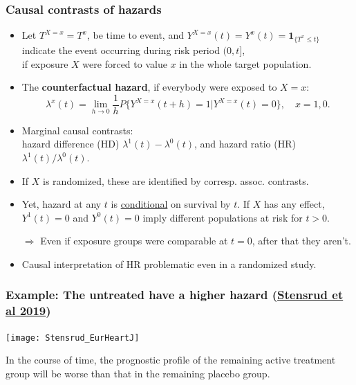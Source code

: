 \documentclass[12pt,dvipsnames,t,aspectratio=169, handout%
]{beamer}
\begin{document}
\begin{frame}
\frametitle{\large Causal contrasts of hazards}

\begin{itemize}
\item
  Let $T^{X=x} = T^x$, be time to event, and 
$Y^{X=x}(t) = Y^x(t) = {\mathbf 1}_{\{T^x \leq t\}}$ 
indicate the event occurring during risk period $(0,t]$, \\ if exposure $X$ were forced
to value $x$ in the {whole target population}.
\pause 
\medskip
\item
The \textbf{counterfactual hazard}, if everybody were exposed to $X=x$:
$$ \lambda^x(t) %
 = \lim_{h \to 0} \frac{1}{h} P\{ Y^{X=x}(t + h)=1 | Y^{X=x}(t) = 0 \}, \quad x = 1,0. $$
\item
Marginal causal contrasts: \\ hazard difference (HD) $\lambda^1(t) - \lambda^0(t)$,
and hazard ratio (HR) ${\lambda^1(t)}/{ \lambda^0(t) }$.
\pause
\medskip
\item
If $X$ is randomized, these are identified by corresp. assoc. contrasts. 
\medskip					
\item  
Yet, hazard at any $t$ is \underline{conditional} on survival by $t$. 
If $X$ has any effect, 
 $Y^{1}(t) =0$ and $Y^{0}(t) =0$ imply
different populations at risk for $t>0$. 
\pause
\item[$\Rightarrow$] Even if exposure groups were comparable at $t=0$,  after that they aren't.
\medskip
\item 
Causal interpretation of HR problematic even in a randomized study.  
\end{itemize}
\end{frame}

\begin{frame}
\frametitle{Example: The untreated have a higher hazard 
     {\small (\href{https://doi.org/10.1093/eurheartj/ehy770}{Stensrud et al 2019})} }
\begin{center}		
\texttt{[image: Stensrud\_EurHeartJ]}
\end{center}
\bi
\item
In the course of time, the prognostic profile of the remaining active treatment group will be worse
than that in the remaining placebo group.
\ei
\end{frame}
\end{document}
